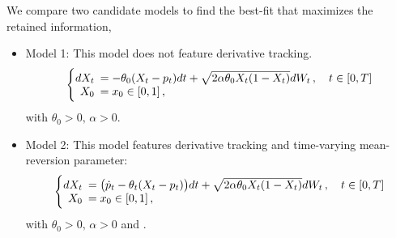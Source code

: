 \documentclass[11pt]{article}
\theoremstyle{definition}
\begin{document}
We compare two candidate models to find the best-fit that maximizes the retained information,
\begin{itemize}
  \item Model 1: This model does not feature derivative tracking.
\begin{equation}
  \left\{
  \begin{array}{@{}rl@{}}
    dX_t \!\!\!&=  - \theta_0 (X_t - p_t) dt +\sqrt{2 \alpha \theta_0 X_t (1 - X_t)} dW_t\,, \quad t \in [0,T]  \\
   X_0  \!\!\!&=  x_0\in [0,1] \,,
 \end{array}\right.  \label{Model1}
\end{equation}
 with $\theta_0 > 0, \, \alpha > 0$.

%  

  \item Model 2: This model features derivative tracking and time-varying mean-reversion parameter:  
\begin{equation}
  \left\{
  \begin{array}{@{}rl@{}}
    dX_t \!\!\!&= \big(\dot{p}_t  - \theta_t (X_t - p_t) \big) dt +\sqrt{2 \alpha \theta_0 X_t (1 - X_t)} dW_t\,, \quad t \in [0,T]  \\
   X_0  \!\!\!&=  x_0\in [0,1] \,,
 \end{array}\right.  \label{Model2}
\end{equation}
 with $\theta_0 > 0, \, \alpha > 0$ and .
\end{itemize}
\end{document}
